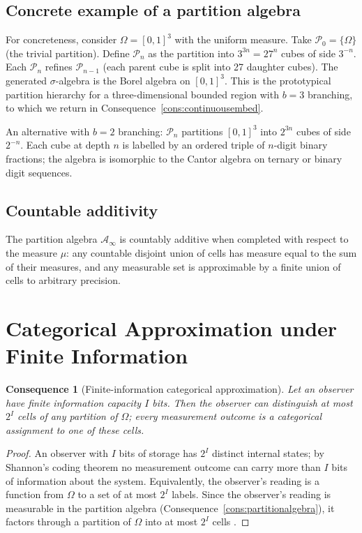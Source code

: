 \documentclass[11pt,twocolumn,a4paper]{article}
\theoremstyle{axiomstyle}
\theoremstyle{conseqstyle}
\newtheorem{consequence}{Consequence}
\theoremstyle{definition}
\theoremstyle{remark}
\newcommand{\Partition}{\mathcal{P}}
\begin{document}
\subsection{Concrete example of a partition algebra}

For concreteness, consider $\Omega=[0,1]^{3}$ with the uniform measure. Take $\Partition_{0}=\{\Omega\}$ (the trivial partition). Define $\Partition_{n}$ as the partition into $3^{3n}=27^{n}$ cubes of side $3^{-n}$. Each $\Partition_{n}$ refines $\Partition_{n-1}$ (each parent cube is split into 27 daughter cubes). The generated $\sigma$-algebra is the Borel algebra on $[0,1]^{3}$. This is the prototypical partition hierarchy for a three-dimensional bounded region with $b=3$ branching, to which we return in Consequence~\ref{cons:continuousembed}.

An alternative with $b=2$ branching: $\Partition_{n}$ partitions $[0,1]^{3}$ into $2^{3n}$ cubes of side $2^{-n}$. Each cube at depth $n$ is labelled by an ordered triple of $n$-digit binary fractions; the algebra is isomorphic to the Cantor algebra on ternary or binary digit sequences.

\subsection{Countable additivity}

The partition algebra $\mathcal{A}_{\infty}$ is countably additive when completed with respect to the measure $\mu$: any countable disjoint union of cells has measure equal to the sum of their measures, and any measurable set is approximable by a finite union of cells to arbitrary precision.

\section{Categorical Approximation under Finite Information}
\label{sec:categoricalapprox}

\begin{consequence}[Finite-information categorical approximation]
\label{cons:categorical}
Let an observer have finite information capacity $I$ bits. Then the observer can distinguish at most $2^{I}$ cells of any partition of $\Omega$; every measurement outcome is a categorical assignment to one of these cells.
\end{consequence}

\begin{proof}
An observer with $I$ bits of storage has $2^{I}$ distinct internal states; by Shannon's coding theorem \citep{shannon1948} no measurement outcome can carry more than $I$ bits of information about the system. Equivalently, the observer's reading is a function from $\Omega$ to a set of at most $2^{I}$ labels. Since the observer's reading is measurable in the partition algebra (Consequence~\ref{cons:partitionalgebra}), it factors through a partition of $\Omega$ into at most $2^{I}$ cells \citep{landauer1961}.
\end{proof}
\end{document}
